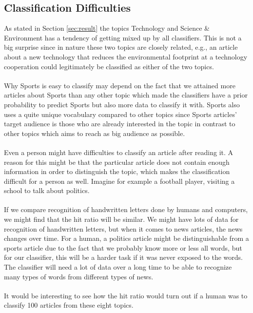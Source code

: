 \subsection{Classification Difficulties}
As stated in Section \ref{sec:result} the topics Technology and Science \& Environment has a tendency of getting mixed up by all classifiers. This is not a big surprise since in nature these two topics are closely related, e.g., an article about a new technology that reduces the environmental footprint at a technology cooperation could legitimately be classified as either of the two topics.\\\\
Why Sports is easy to classify may depend on the fact that we attained more articles about Sports than any other topic which made the classifiers have a prior probability to predict Sports but also more data to classify it with. Sports also uses a quite unique vocabulary compared to other topics since Sports articles' target audience is those who are already interested in the topic in contrast to other topics which aims to reach as big audience as possible.
\\\\
Even a person might have difficulties to classify an article after reading it. A reason for this might be that the particular article does not contain enough information in order to distinguish the topic, which makes the classification difficult for a person as well. Imagine for example a football player, visiting a school to talk about politics.
\\\\
If we compare recognition of handwritten letters done by humans and computers, we might find that the hit ratio will be similar. We might have lots of data for recognition of handwritten letters, but when it comes to news articles, the news changes over time. For a human, a politics article might be distinguishable from a sports article due to the fact that we probably know more or less all words, but for our classifier, this will be a harder task if it was never exposed to the words. The classifier will need a lot of data over a long time to be able to recognize many types of words from different types of news.
\\\\
It would be interesting to see how the hit ratio would turn out if a human was to classify 100 articles from these eight topics. 